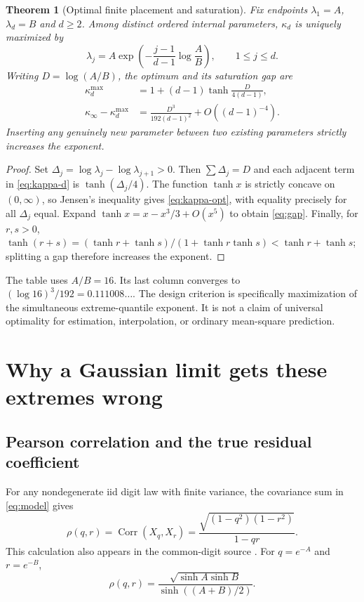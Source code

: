 \documentclass[11pt,a4paper]{article}
\newtheorem{theorem}{Theorem}[section]
\theoremstyle{definition}
\theoremstyle{remark}
\newcommand{\Corr}{\operatorname{Corr}}
\numberwithin{equation}{section}
\begin{document}
\begin{theorem}[Optimal finite placement and saturation]
\label{thm:design}
Fix endpoints $\lambda_1=A$, $\lambda_d=B$ and $d\ge2$. Among distinct
ordered internal parameters, $\kappa_d$ is uniquely maximized by
\begin{equation}
 \lambda_j=A\exp\left(-\frac{j-1}{d-1}\log\frac AB\right),
 \qquad 1\le j\le d.
 \label{eq:optimal-mesh}
\end{equation}
Writing $D=\log(A/B)$, the optimum and its saturation gap are
\begin{align}
 \kappa_d^{\max}&=1+(d-1)\tanh\frac{D}{4(d-1)},\label{eq:kappa-opt}\\
 \kappa_\infty-\kappa_d^{\max}
 &=\frac{D^3}{192(d-1)^2}+O((d-1)^{-4}).\label{eq:gap}
\end{align}
Inserting any genuinely new parameter between two existing parameters
strictly increases the exponent.
\end{theorem}
\begin{proof}
Set $\Delta_j=\log\lambda_j-\log\lambda_{j+1}>0$. Then
$\sum\Delta_j=D$ and each adjacent term in \eqref{eq:kappa-d} is
$\tanh(\Delta_j/4)$. The function $\tanh x$ is strictly concave on
$(0,\infty)$, so Jensen's inequality gives
\eqref{eq:kappa-opt}, with equality precisely for all $\Delta_j$ equal.
Expand $\tanh x=x-x^3/3+O(x^5)$ to obtain \eqref{eq:gap}.
Finally, for $r,s>0$,
$\tanh(r+s)=(\tanh r+\tanh s)/(1+\tanh r\tanh s)
<\tanh r+\tanh s$; splitting a gap therefore increases the exponent.
\end{proof}

\begin{center}

\end{center}
The table uses $A/B=16$. Its last column converges to
$(\log16)^3/192=0.111008\ldots$. The design criterion is specifically
maximization of the simultaneous extreme-quantile exponent. It is not a
claim of universal optimality for estimation, interpolation, or ordinary
mean-square prediction.

\section{Why a Gaussian limit gets these extremes wrong}
\label{sec:gaussian}

\subsection{Pearson correlation and the true residual coefficient}
For any nondegenerate iid digit law with finite variance, the covariance
sum in \eqref{eq:model} gives
\begin{equation}
 \rho(q,r)=\Corr(X_q,X_r)
 =\frac{\sqrt{(1-q^2)(1-r^2)}}{1-qr}.
 \label{eq:rho}
\end{equation}
This calculation also appears in the common-digit source
\cite{RepoCommon}. For $q=e^{-A}$ and $r=e^{-B}$,
\begin{equation}
 \rho(q,r)=\frac{\sqrt{\sinh A\sinh B}}{\sinh((A+B)/2)}.
 \label{eq:rho-hyperbolic}
\end{equation}
\end{document}
